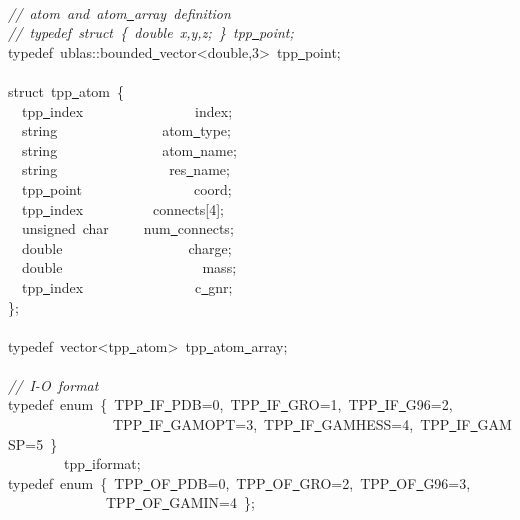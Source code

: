 \documentclass[a4paper,10pt]{article}
\begin{document}
{\ \\
\textsl{//\ atom\ and\ atom\underline\ array\ definition}\\
\textsl{//\ typedef\ struct\ \{\ double\ x,y,z;\ \}\ tpp\underline\ point;}\\
typedef\ ublas::bounded\underline\ vector<{}double,3>{}\ tpp\underline\ point;\\
\ \\
struct\ tpp\underline\ atom\ \{\\
\ \ tpp\underline\ index\ \ \ \ \ \ \ \ \ \ \ \ \ \ \ \ index;\\
\ \ string\ \ \ \ \ \ \ \ \ \ \ \ \ \ \ atom\underline\ type;\\
\ \ string\ \ \ \ \ \ \ \ \ \ \ \ \ \ \ atom\underline\ name;\\
\ \ string\ \ \ \ \ \ \ \ \ \ \ \ \ \ \ \ res\underline\ name;\\
\ \ tpp\underline\ point\ \ \ \ \ \ \ \ \ \ \ \ \ \ \ \ coord;\\
\ \ tpp\underline\ index\ \ \ \ \ \ \ \ \ \ connects[4];\\
\ \ unsigned\ char\ \ \ \ \ num\underline\ connects;\\
\ \ double\ \ \ \ \ \ \ \ \ \ \ \ \ \ \ \ \ \ charge;\\
\ \ double\ \ \ \ \ \ \ \ \ \ \ \ \ \ \ \ \ \ \ \ mass;\\
\ \ tpp\underline\ index\ \ \ \ \ \ \ \ \ \ \ \ \ \ \ \ c\underline\ gnr;\\
\};\\
\ \\
typedef\ vector<{}tpp\underline\ atom>{}\ tpp\underline\ atom\underline\ array;\\
\ \\
\textsl{//\ I-{}O\ format}\\
typedef\ enum\ \{\ TPP\underline\ IF\underline\ PDB=0,\ TPP\underline\ IF\underline\ GRO=1,\ TPP\underline\ IF\underline\ G96=2,\ \\
\ \ \ \ \ \ \ \ \ \ \ \ \ \ \ TPP\underline\ IF\underline\ GAMOPT=3,\ TPP\underline\ IF\underline\ GAMHESS=4,\ TPP\underline\ IF\underline\ GAMSP=5\ \}\ \\
\ \ \ \ \ \ \ \ tpp\underline\ iformat;\\
typedef\ enum\ \{\ TPP\underline\ OF\underline\ PDB=0,\ TPP\underline\ OF\underline\ GRO=2,\ TPP\underline\ OF\underline\ G96=3,\\
\ \ \ \ \ \ \ \ \ \ \ \ \ \ TPP\underline\ OF\underline\ GAMIN=4\ \};\\
\ \\
}
\end{document}
